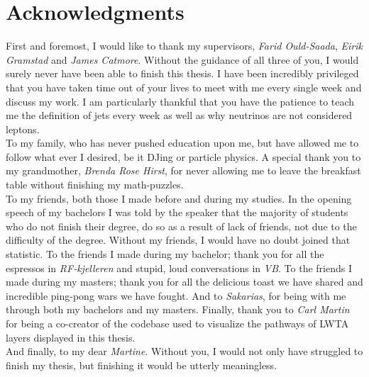 \chapter*{Acknowledgments}
First and foremost, I would like to thank my supervisors, \emph{Farid Ould-Saada}, \emph{Eirik Gramstad} and \emph{James Catmore}. 
Without the guidance of all three of you, I would surely never have been able to finish this thesis. I have been incredibly
privileged that you have taken time out of your lives to meet with me every single week and discuss my work. 
I am particularly thankful that you have the patience to teach me the definition of jets every week as well as
why neutrinos are not considered leptons.
\\\newline
To my family, who has never pushed education upon me, but have allowed me to follow what ever I desired, be it DJing or 
particle physics. A special thank you to my grandmother, \emph{Brenda Rose Hirst}, for never allowing me to leave the breakfast table 
without finishing my math-puzzles.
\\\newline
To my friends, both those I made before and during my studies. In the opening speech of my bachelors I was told by the speaker that 
the majority of students who do not finish their degree, do so as a result of lack of friends, not due to the difficulty of the degree.
Without my friends, I would have no doubt joined that statistic. To the friends I made during my bachelor; thank you for all the espressos in \emph{RF-kjelleren}
and stupid, loud conversations in \emph{VB}. To the friends I made during my masters; thank you for all the delicious toast we have shared and 
incredible ping-pong wars we have fought. And to \emph{Sakarias}, for being with me through both my bachelors and my masters. Finally, thank you to 
\emph{Carl Martin} for being a co-creator of the codebase used to visualize the pathways of \acs{LWTA} layers displayed in this thesis. 
\\\newline
And finally, to my dear \emph{Martine}. Without you, I would not only have struggled to finish my thesis, but finishing it would be utterly 
meaningless.
